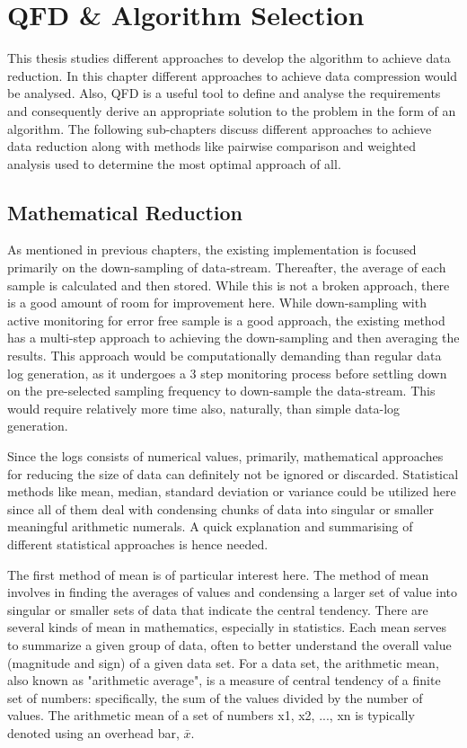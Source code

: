 \section{QFD \& Algorithm Selection}\label{sec:Algorithm definition}

This thesis studies different approaches to develop the algorithm to achieve data reduction. In this chapter different approaches to achieve data compression would be analysed. Also, QFD is a useful tool to define and analyse the requirements and consequently derive an appropriate solution to the problem in the form of an algorithm. The following sub-chapters discuss different approaches to achieve data reduction along with methods like pairwise comparison and weighted analysis used to determine the most optimal approach of all.

\subsection{Mathematical Reduction}
As mentioned in previous chapters, the existing implementation is focused primarily on the down-sampling of data-stream. Thereafter, the average of each sample is calculated and then stored. While this is not a broken approach, there is a good amount of room for improvement here. While down-sampling with active monitoring for error free sample is a good approach, the existing method has a multi-step approach to achieving the down-sampling and then averaging the results. This approach would be computationally demanding than regular data log generation, as it undergoes a 3 step monitoring process before settling down on the pre-selected sampling frequency to down-sample the data-stream. This would require relatively more time also, naturally, than simple data-log generation. 

Since the logs consists of numerical values, primarily, mathematical approaches for reducing the size of data can definitely not be ignored or discarded. Statistical methods like mean, median, standard deviation or variance could be utilized here since all of them deal with condensing chunks of data into singular or smaller meaningful arithmetic numerals. A quick explanation and summarising of different statistical approaches is hence needed. 

The first method of mean is of particular interest here. The method of mean involves in finding the averages of values and condensing a larger set of value into singular or smaller sets of data that indicate the central tendency. There are several kinds of mean in mathematics, especially in statistics. Each mean serves to summarize a given group of data, often to better understand the overall value (magnitude and sign) of a given data set. For a data set, the arithmetic mean, also known as "arithmetic average", is a measure of central tendency of a finite set of numbers: specifically, the sum of the values divided by the number of values. The arithmetic mean of a set of numbers x1, x2, ..., xn is typically denoted using an overhead bar, $\bar{x}$. \cite{mean} 

